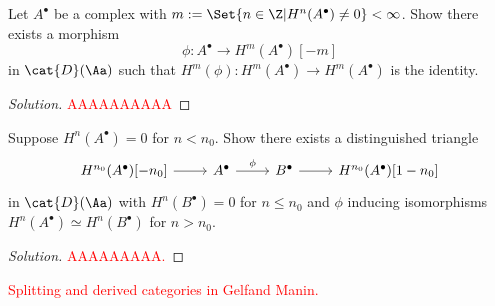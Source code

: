 \begin{exercise}
    Let $A^{\bullet}$ be a complex with 
    $m := \Set{n \in \Z| H^{n}(A^{\bullet}) \ne 0} < \infty$.
    Show there exists a morphism
    \begin{equation*}
        \phi : A^{\bullet} \longrightarrow H^{m}(A^{\bullet})[-m]
    \end{equation*}
    in $\cat{D}(\Aa)$ such that 
    $H^{m}(\phi) : H^{m}(A^{\bullet}) \to H^{m}(A^{\bullet})$
    is the identity.
    \begin{proof}[Solution]
        \textcolor{red}{AAAAAAAAAA}
    \end{proof}
\end{exercise}

\begin{exercise}
    Suppose $H^{n}(A^{\bullet}) = 0$ for $n < n_{0}$.
    Show there exists a distinguished triangle
    \begin{equation*}
        \begin{tikzcd}
            H^{n_{0}}(A^{\bullet}){[-n_{0}]} \ar[r]
            & A^{\bullet} \ar[r, "\phi"]
            & B^{\bullet} \ar[r]
            & H^{n_{0}}(A^{\bullet}){[1-n_{0}]}
        \end{tikzcd}
    \end{equation*}
    in $\cat{D}(\Aa)$ with $H^{n}(B^{\bullet})=0$ 
    for $n \le n_{0}$ and $\phi$ inducing isomorphisms
    $H^{n}(A^{\bullet}) \simeq H^{n}(B^{\bullet})$ for $n > n_{0}$.
    \begin{proof}[Solution]
        \textcolor{red}{AAAAAAAAA.}
    \end{proof}
\end{exercise}

\textcolor{red}{Splitting and derived categories in Gelfand Manin.}
